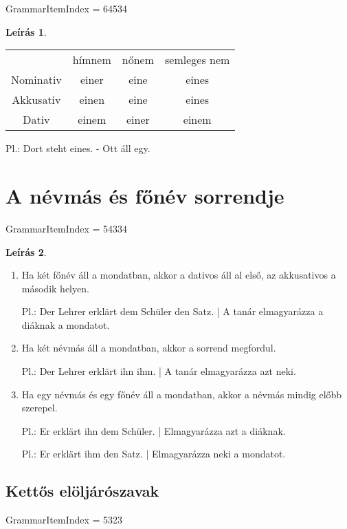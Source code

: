 \documentclass{article}
\theoremstyle{definition}
\newtheorem*{desc}{Leírás}
\begin{document}
GrammarItemIndex = 64534

\begin{desc}
\begin{tabular}{cccc}
 & hímnem & nőnem & semleges nem \\
 Nominativ & einer & eine & eines \\
 Akkusativ & einen & eine & eines \\
 Dativ & einem & einer & einem \\
\end{tabular}

Pl.: Dort steht eines. - Ott áll egy.
\end{desc}

\section{A névmás és főnév sorrendje}

GrammarItemIndex = 54334

\begin{desc}
\begin{enumerate}
\item Ha két főnév áll a mondatban, akkor a dativos áll al első, az akkusativos a második helyen.

Pl.: Der Lehrer erklärt dem Schüler den Satz. | A tanár elmagyarázza a diáknak a mondatot.

\item Ha két névmás áll a mondatban, akkor a sorrend megfordul.

Pl.: Der Lehrer erklärt ihn ihm. | A tanár elmagyarázza azt neki.

\item Ha egy névmás és egy főnév áll a mondatban, akkor a névmás mindig előbb szerepel.

Pl.: Er erklärt ihn dem Schüler. | Elmagyarázza azt a diáknak.

Pl.: Er erklärt ihm den Satz. | Elmagyarázza neki a mondatot.
\end{enumerate}
\end{desc}

\subsection{Kettős elöljárószavak}

GrammarItemIndex = 5323
\end{document}
